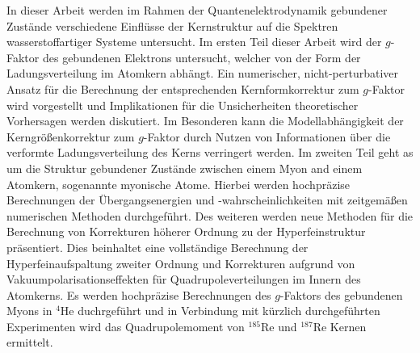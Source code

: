 
{
In dieser Arbeit werden im Rahmen der Quantenelektrodynamik gebundener Zustände verschiedene Einflüsse der Kernstruktur auf die Spektren wasserstoffartiger Systeme untersucht.
Im ersten Teil dieser Arbeit wird der $g$-Faktor des gebundenen Elektrons untersucht, welcher von der Form der Ladungsverteilung im Atomkern abhängt. Ein numerischer, nicht-perturbativer Ansatz für die Berechnung der entsprechenden Kernformkorrektur zum $g$-Faktor wird vorgestellt und Implikationen für die Unsicherheiten theoretischer Vorhersagen werden diskutiert. Im Besonderen kann die Modellabhängigkeit der Kerngrößenkorrektur zum $g$-Faktor durch Nutzen von Informationen über die verformte Ladungsverteilung des Kerns verringert werden.
Im zweiten Teil geht as um die Struktur gebundener Zustände zwischen einem Myon and einem Atomkern, sogenannte myonische Atome.
Hierbei werden hochpräzise Berechnungen der Übergangsenergien und -wahrscheinlichkeiten mit zeitgemäßen numerischen Methoden durchgeführt. Des weiteren werden neue Methoden für die Berechnung von Korrekturen höherer Ordnung zu der Hyperfeinstruktur präsentiert. Dies beinhaltet eine vollständige Berechnung der Hyperfeinaufspaltung zweiter Ordnung und Korrekturen aufgrund von Vakuumpolarisationseffekten für Quadrupoleverteilungen im Innern des Atomkerns.
Es werden hochpräzise Berechnungen des $g$-Faktors des gebundenen Myons in $^{4}$He duchrgeführt und in Verbindung mit kürzlich durchgeführten Experimenten wird das Quadrupolemoment von $^{185}$Re und $^{187}$Re Kernen ermittelt.
}
